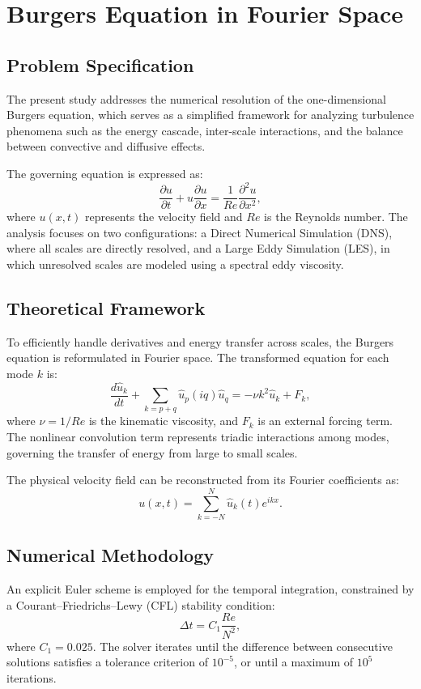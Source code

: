 \section{Burgers Equation in Fourier Space}

\subsection{Problem Specification}
The present study addresses the numerical resolution of the one-dimensional Burgers equation, which serves as a simplified framework for analyzing turbulence phenomena such as the energy cascade, inter-scale interactions, and the balance between convective and diffusive effects.

The governing equation is expressed as:
\begin{equation}
\frac{\partial u}{\partial t} + u \frac{\partial u}{\partial x} = \frac{1}{Re}\frac{\partial^2 u}{\partial x^2},
\end{equation}
where $u(x,t)$ represents the velocity field and $Re$ is the Reynolds number. The analysis focuses on two configurations: a Direct Numerical Simulation (DNS), where all scales are directly resolved, and a Large Eddy Simulation (LES), in which unresolved scales are modeled using a spectral eddy viscosity.

\subsection{Theoretical Framework}
To efficiently handle derivatives and energy transfer across scales, the Burgers equation is reformulated in Fourier space. The transformed equation for each mode $k$ is:
\begin{equation}
\frac{d\hat{u}_k}{dt} + \sum_{k=p+q}\hat{u}_p(iq)\hat{u}_q = -\nu k^2 \hat{u}_k + F_k,
\end{equation}
where $\nu = 1/Re$ is the kinematic viscosity, and $F_k$ is an external forcing term. The nonlinear convolution term represents triadic interactions among modes, governing the transfer of energy from large to small scales.

The physical velocity field can be reconstructed from its Fourier coefficients as:
\begin{equation}
u(x,t) = \sum_{k=-N}^{N} \hat{u}_k(t)e^{ikx}.
\end{equation}

\subsection{Numerical Methodology}
An explicit Euler scheme is employed for the temporal integration, constrained by a Courant–Friedrichs–Lewy (CFL) stability condition:
\begin{equation}
\Delta t = C_{1}\frac{Re}{N^2},
\end{equation}
where $C_{1}=0.025$. The solver iterates until the difference between consecutive solutions satisfies a tolerance criterion of $10^{-5}$, or until a maximum of $10^5$ iterations.


